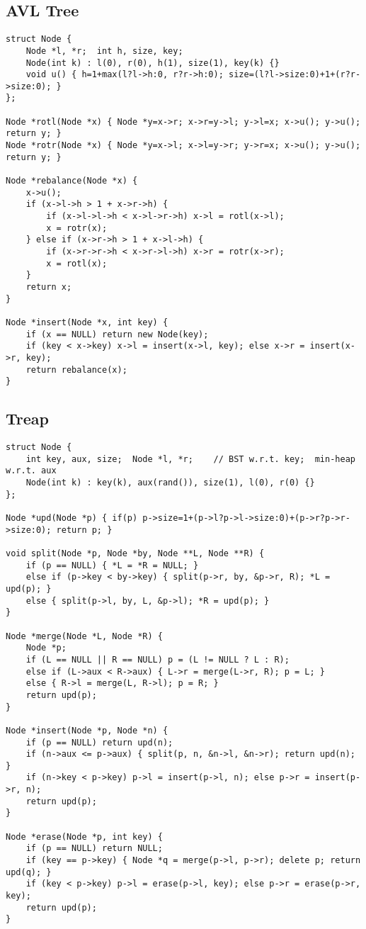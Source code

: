\documentclass[a4paper, 12pt]{article}
\begin{document}
\subsection*{AVL Tree}
\vspace{-3mm}
\begin{Verbatim}[fontsize=\small]
struct Node {
    Node *l, *r;  int h, size, key;
    Node(int k) : l(0), r(0), h(1), size(1), key(k) {}
    void u() { h=1+max(l?l->h:0, r?r->h:0); size=(l?l->size:0)+1+(r?r->size:0); }
};

Node *rotl(Node *x) { Node *y=x->r; x->r=y->l; y->l=x; x->u(); y->u(); return y; }
Node *rotr(Node *x) { Node *y=x->l; x->l=y->r; y->r=x; x->u(); y->u(); return y; }

Node *rebalance(Node *x) {
    x->u();
    if (x->l->h > 1 + x->r->h) {
        if (x->l->l->h < x->l->r->h) x->l = rotl(x->l);
        x = rotr(x);
    } else if (x->r->h > 1 + x->l->h) {
        if (x->r->r->h < x->r->l->h) x->r = rotr(x->r);
        x = rotl(x);
    }
    return x;
}

Node *insert(Node *x, int key) {
    if (x == NULL) return new Node(key);
    if (key < x->key) x->l = insert(x->l, key); else x->r = insert(x->r, key);
    return rebalance(x);
}
\end{Verbatim}

\subsection*{Treap}
\vspace{-3mm}
\begin{Verbatim}[fontsize=\small]
struct Node {
    int key, aux, size;  Node *l, *r;    // BST w.r.t. key;  min-heap w.r.t. aux
    Node(int k) : key(k), aux(rand()), size(1), l(0), r(0) {}
};

Node *upd(Node *p) { if(p) p->size=1+(p->l?p->l->size:0)+(p->r?p->r->size:0); return p; }

void split(Node *p, Node *by, Node **L, Node **R) {
    if (p == NULL) { *L = *R = NULL; }
    else if (p->key < by->key) { split(p->r, by, &p->r, R); *L = upd(p); }
    else { split(p->l, by, L, &p->l); *R = upd(p); }
}

Node *merge(Node *L, Node *R) {
    Node *p;
    if (L == NULL || R == NULL) p = (L != NULL ? L : R);
    else if (L->aux < R->aux) { L->r = merge(L->r, R); p = L; }
    else { R->l = merge(L, R->l); p = R; }
    return upd(p);
}

Node *insert(Node *p, Node *n) {
    if (p == NULL) return upd(n);
    if (n->aux <= p->aux) { split(p, n, &n->l, &n->r); return upd(n); }
    if (n->key < p->key) p->l = insert(p->l, n); else p->r = insert(p->r, n);
    return upd(p);
}

Node *erase(Node *p, int key) {
    if (p == NULL) return NULL;
    if (key == p->key) { Node *q = merge(p->l, p->r); delete p; return upd(q); }
    if (key < p->key) p->l = erase(p->l, key); else p->r = erase(p->r, key);
    return upd(p);
}
\end{Verbatim}
\end{document}
